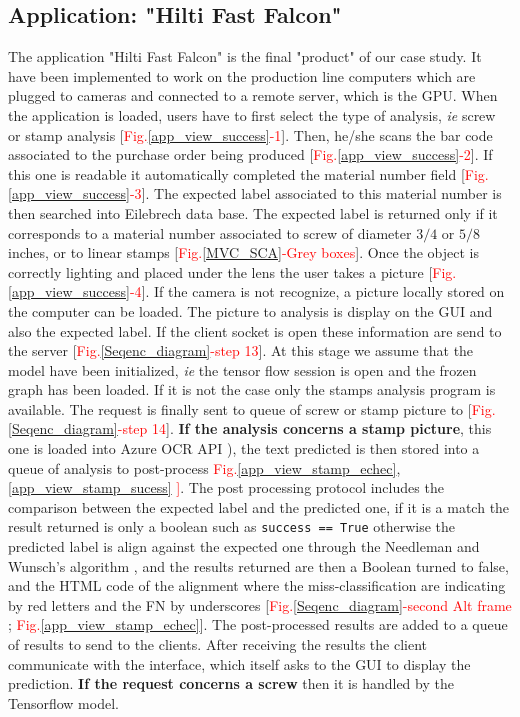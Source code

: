 \documentclass[12pt, french, a4paper]{article} %
\begin{document}
\subsection{Application: "Hilti Fast Falcon"}
The application "Hilti Fast Falcon" is the final "product" of our case study. It have been implemented to work on the production line computers which are plugged to cameras and connected to a remote server, which is the \gls{GPU}. When the application is loaded, users have to first select the type of analysis, \textit{ie} screw or stamp analysis [\textcolor{red}{Fig.}\ref{app_view_success}\textcolor{red}{-1}]. Then, he/she scans the bar code associated to the purchase order being produced [\textcolor{red}{Fig.}\ref{app_view_success}\textcolor{red}{-2}]. If this one is readable it automatically completed the material number field [\textcolor{red}{Fig.}\ref{app_view_success}\textcolor{red}{-3}]. The expected label associated to this material number is then searched into Eilebrech data base. The expected label is returned only if it corresponds to a material number associated to screw of diameter $3/4$ or $5/8$ inches, or to linear stamps [\textcolor{red}{Fig.}\ref{MVC_SCA}\textcolor{red}{-Grey boxes}]. Once the object is correctly lighting and placed under the lens the user takes a picture [\textcolor{red}{Fig.}\ref{app_view_success}\textcolor{red}{-4}]. If the camera is not recognize, a picture locally stored on the computer can be loaded. The picture to analysis is display on the \gls{GUI} and also the expected label. If the client socket is open these information are send to the server [\textcolor{red}{Fig.}\ref{Seqenc_diagram}\textcolor{red}{-step 13}]. At this stage we assume that the model have been initialized, \textit{ie} the tensor flow session is open and the frozen graph has been loaded. If it is not the case only the stamps analysis program is available. The request is finally sent to queue of screw or stamp picture to [\textcolor{red}{Fig.}\ref{Seqenc_diagram}\textcolor{red}{-step 14}]. \textbf{If the analysis concerns a stamp picture}, this one is loaded into Azure OCR API \cite{AzureOCR}), the text predicted is then stored into a queue of analysis to post-process \textcolor{red}{Fig.}\ref{app_view_stamp_echec},\ref{app_view_stamp_sucess} \textcolor{red}]. The post processing protocol includes the comparison between the expected label and the predicted one, if it is a match the result returned is only a boolean such as \verb|success == True| otherwise the predicted label is align against the expected one through the Needleman and Wunsch's algorithm \cite{spr1970general}, and the results returned are then a Boolean turned to false, and the HTML code of the alignment where the miss-classification are indicating by red letters and the \gls{FN} by underscores [\textcolor{red}{Fig.}\ref{Seqenc_diagram}\textcolor{red}{-second Alt frame} ; \textcolor{red}{Fig.}\ref{app_view_stamp_echec}]. The post-processed results are added to a queue of results to send to the clients. After receiving the results the client communicate with the interface, which itself asks to the \gls{GUI} to display the prediction. \textbf{If the request concerns a screw} then it is handled by the Tensorflow model. 
\end{document}
